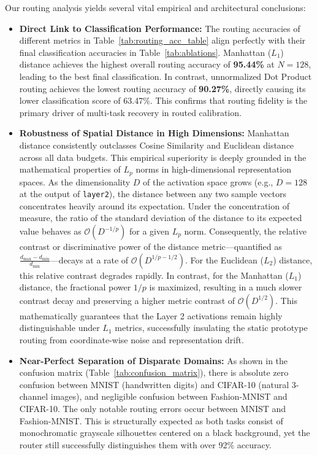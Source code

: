 \documentclass{article}
\theoremstyle{plain}
\theoremstyle{definition}
\theoremstyle{remark}
\begin{document}
Our routing analysis yields several vital empirical and architectural conclusions:
\begin{itemize}
    \item \textbf{Direct Link to Classification Performance:} The routing accuracies of different metrics in Table~\ref{tab:routing_acc_table} align perfectly with their final classification accuracies in Table~\ref{tab:ablations}. Manhattan ($L_1$) distance achieves the highest overall routing accuracy of \textbf{95.44\%} at $N=128$, leading to the best final classification. In contrast, unnormalized Dot Product routing achieves the lowest routing accuracy of \textbf{90.27\%}, directly causing its lower classification score of 63.47\%. This confirms that routing fidelity is the primary driver of multi-task recovery in routed calibration.
    \item \textbf{Robustness of Spatial Distance in High Dimensions:} Manhattan distance consistently outclasses Cosine Similarity and Euclidean distance across all data budgets. This empirical superiority is deeply grounded in the mathematical properties of $L_p$ norms in high-dimensional representation spaces. As the dimensionality $D$ of the activation space grows (e.g., $D=128$ at the output of \texttt{layer2}), the distance between any two sample vectors concentrates heavily around its expectation. Under the concentration of measure, the ratio of the standard deviation of the distance to its expected value behaves as $\mathcal{O}(D^{-1/p})$ for a given $L_p$ norm. Consequently, the relative contrast or discriminative power of the distance metric---quantified as $\frac{d_{\max} - d_{\min}}{d_{\min}}$---decays at a rate of $\mathcal{O}(D^{1/p - 1/2})$. For the Euclidean ($L_2$) distance, this relative contrast degrades rapidly. In contrast, for the Manhattan ($L_1$) distance, the fractional power $1/p$ is maximized, resulting in a much slower contrast decay and preserving a higher metric contrast of $\mathcal{O}(D^{1/2})$. This mathematically guarantees that the Layer 2 activations remain highly distinguishable under $L_1$ metrics, successfully insulating the static prototype routing from coordinate-wise noise and representation drift.
    \item \textbf{Near-Perfect Separation of Disparate Domains:} As shown in the confusion matrix (Table~\ref{tab:confusion_matrix}), there is absolute zero confusion between MNIST (handwritten digits) and CIFAR-10 (natural 3-channel images), and negligible confusion between Fashion-MNIST and CIFAR-10. The only notable routing errors occur between MNIST and Fashion-MNIST. This is structurally expected as both tasks consist of monochromatic grayscale silhouettes centered on a black background, yet the router still successfully distinguishes them with over 92\% accuracy.
\end{itemize}
\end{document}
